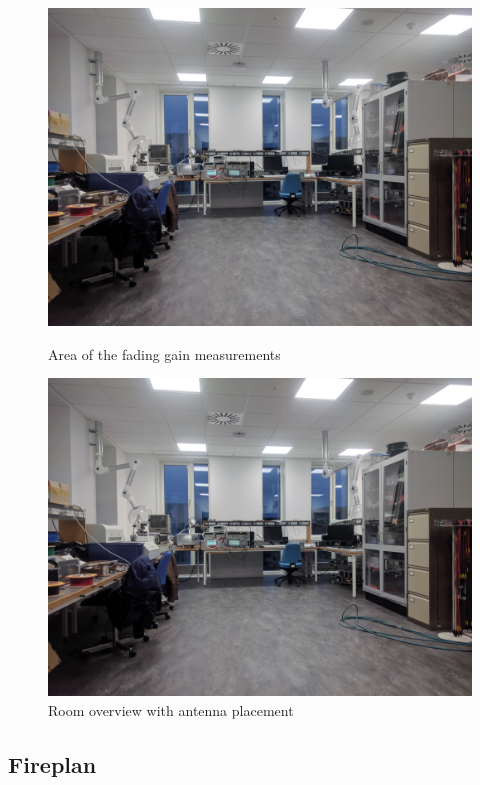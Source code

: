 \begin{figure}[H]
  \centering
  \begin{minipage}[H]{0.4\textwidth}
    \includegraphics[width=\textwidth]{pictures/Measurement/walking_meas.jpg}
    \caption{Area of the fading gain measurements}
    \label{walk_area}
  \end{minipage}
  \hfill
  \begin{minipage}[H]{0.4\textwidth}
    \includegraphics[width=\textwidth]{pictures/Measurement/walking_meas.jpg}
    \caption{Room overview with antenna placement}
  \end{minipage}
\end{figure}
\subsection{Fireplan}

